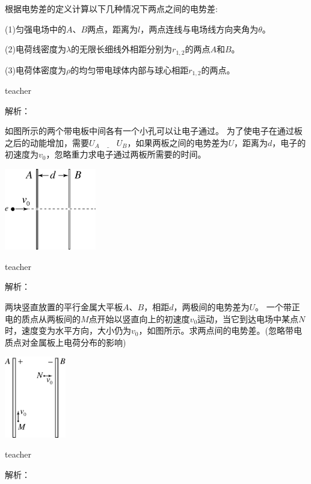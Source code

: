 \begin{example}
根据电势差的定义计算以下几种情况下两点之间的电势差:

(1)匀强电场中的$A$、$B$两点，距离为$l$，两点连线与电场线方向夹角为$\theta$。

(2)电荷线密度为$\lambda$的无限长细线外相距分别为$r_{1,2}$的两点$A$和$B$。

(3)电荷体密度为$ \rho$的均匀带电球体内部与球心相距$r_{1,2}$的两点。

\begin{taggedblock}{teacher}

解析：
\end{taggedblock}
\end{example}

\begin{example}
如图所示的两个带电板中间各有一个小孔可以让电子通过。
为了使电子在通过板之后的动能增加，需要$U_A\underline{\qquad}U_B$，如果两板之间的电势差为$U$，距离为$d$，电子的初速度为$v_0$，忽略重力求电子通过两板所需要的时间。
\begin{flushright}
\includegraphics[width=0.3\textwidth]{images/elec-problem-6.pdf}
\end{flushright}
\begin{taggedblock}{teacher}

解析：
\end{taggedblock}
\end{example}




\begin{example}
两块竖直放置的平行金属大平板$A$、$B$，相距$d$，两极间的电势差为$U$。
一个带正电的质点从两板间的$M$点开始以竖直向上的初速度$v_0$运动，当它到达电场中某点$N$时，速度变为水平方向，大小仍为$v_0$，如图所示。求两点间的电势差。(忽略带电质点对金属板上电荷分布的影响)
\begin{flushright}
\includegraphics[width=0.2\textwidth]{images/elec-problem-1.pdf}
\end{flushright}
\begin{taggedblock}{teacher}

解析：
\end{taggedblock}
\end{example}

